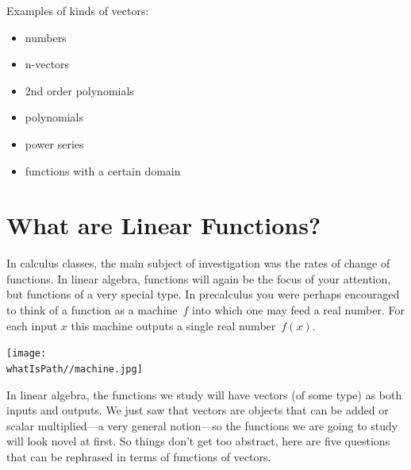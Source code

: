 \noindent 
Examples of kinds of vectors:\\
\begin{itemize}
\item numbers
\item n-vectors
\item 2nd order polynomials
\item polynomials
\item power series
\item functions with a certain domain
\end{itemize}



\section{What are Linear Functions?}
\label{LTs}

In calculus classes, the main subject of investigation was the rates of change of functions. 
In linear algebra, functions
will again be the focus of your attention, 
but functions of a very special type. 
In precalculus you 
were perhaps encouraged to think of a function as a machine~$f$
into which one may feed a real number. 
For each input $x$ this machine outputs a single real number~$f(x)$. 

\begin{center}
\texttt{[image: \\whatIsPath//machine.jpg]}
\end{center}

In linear algebra, the functions we study will have vectors (of some type) as both inputs and outputs. 
We just saw that vectors are objects that can be added or scalar multiplied---a very general notion---so the functions we are going to study will look novel at first. 
So things don't get too abstract, here are five questions that can be rephrased in terms of functions of vectors.


